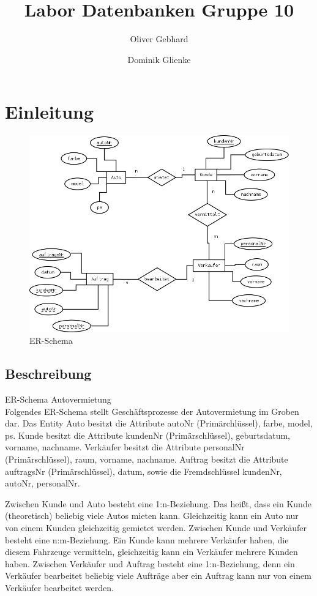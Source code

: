 \documentclass[a4paper,12pt]{article}
\begin{document}
\title{Labor Datenbanken Gruppe 10}
\author{ Oliver Gebhard \and Dominik Glienke }
\maketitle

\newpage
\tableofcontents
\newpage
\setcounter{tocdepth}{2}


\section{Einleitung}

\begin{figure}[h]
    \centering
    \includegraphics[scale=0.34]{ER_Schema_Autovermietung.png}
    \caption{ER-Schema}
    \label{Autovermietung}
\end{figure}

\subsection{Beschreibung}

ER-Schema Autovermietung \\

Folgendes ER-Schema stellt Geschäftsprozesse der Autovermietung im Groben dar. 
Das Entity 	Auto besitzt die Attribute autoNr (Primärchlüssel), farbe, model, ps.
		Kunde besitzt die Attribute kundenNr (Primärschlüssel), geburtsdatum, vorname, nachname.
Verkäufer besitzt die Attribute personalNr (Primärschlüssel), raum, vorname, nachname.
Auftrag besitzt die Attribute auftragsNr (Primärschlüssel), datum, sowie die Fremdschlüssel kundenNr, autoNr, personalNr.

Zwischen Kunde und Auto besteht eine 1:n-Beziehung. Das heißt, dass ein Kunde (theoretisch) beliebig viele Autos mieten kann. Gleichzeitig kann ein Auto nur von einem Kunden gleichzeitig gemietet werden.
Zwischen Kunde und Verkäufer besteht eine n:m-Beziehung. Ein Kunde kann mehrere Verkäufer haben, die diesem Fahrzeuge vermitteln, gleichzeitig kann ein Verkäufer mehrere Kunden haben.
Zwischen Verkäufer und Auftrag besteht eine 1:n-Beziehung, denn ein Verkäufer bearbeitet beliebig viele Aufträge aber ein Auftrag kann nur von einem Verkäufer bearbeitet werden.
\end{document}
